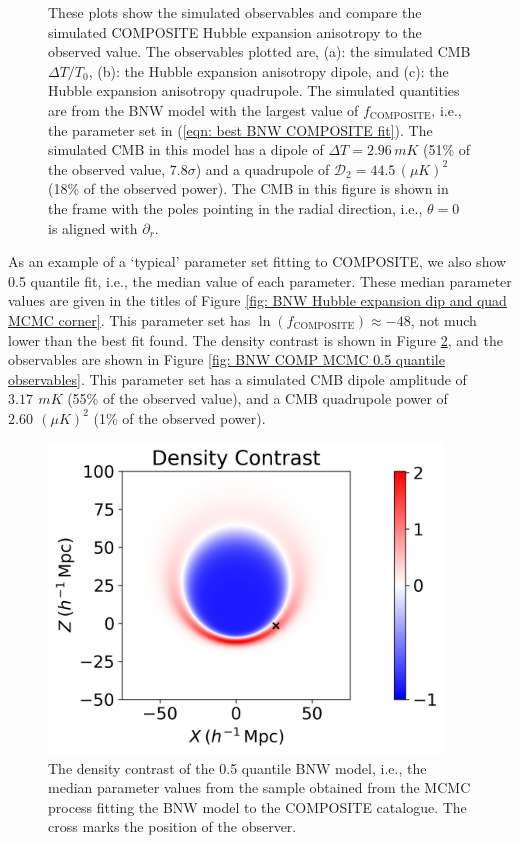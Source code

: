 \documentclass[a4paper,12pt]{report}
\begin{document}
\begin{figure}[ht]
\begin{subfigure}[b]{105mm}
        \caption{}
    \end{subfigure}
    \caption{These plots show the simulated observables and compare the simulated COMPOSITE Hubble expansion anisotropy to the observed value. The observables plotted are, (a): the simulated CMB $\Delta T / T_0$, (b): the Hubble expansion anisotropy dipole, and (c): the Hubble expansion anisotropy quadrupole. The simulated quantities are from the BNW model with the largest value of $f_\text{COMPOSITE}$, i.e., the parameter set in (\ref{eqn: best BNW COMPOSITE fit}). The simulated CMB in this model has a dipole of $\Delta T = 2.96\, \si{mK}$ (51\% of the observed value, $7.8\sigma$) and a quadrupole of $\mathcal{D}_2 = 44.5\, (\mu \si{K})^2$ (18\% of the observed power). The CMB in this figure is shown in the frame with the poles pointing in the radial direction, i.e., $\theta=0$ is aligned with $\partial_r$.}
    \label{fig: CMB and Hubble for BNW best fitting to COMPOSITE}
\end{figure}

As an example of a `typical' parameter set fitting to COMPOSITE, we also show 0.5 quantile fit, i.e., the median value of each parameter. These median parameter values are given in the titles of Figure \ref{fig: BNW Hubble expansion dip and quad MCMC corner}. This parameter set has $\ln(f_\text{COMPOSITE}) \approx -48$, not much lower than the best fit found. The density contrast is shown in Figure \ref{fig: BNW model 0.5 quantile density contrast}, and the observables are shown in Figure \ref{fig: BNW COMP MCMC 0.5 quantile observables}. This parameter set has a simulated CMB dipole amplitude of $3.17\,~\si{mK}$ (55\% of the observed value), and a CMB quadrupole power of $2.60\,~(\mu \si{K})^2$ (1\% of the observed power).

\begin{figure}
    \centering
    \includegraphics[width=105mm]{BNW Model MCMC/0.5 Quantile/density contrast.png}
    \caption{The density contrast of the 0.5 quantile BNW model, i.e., the median parameter values from the sample obtained from the MCMC process fitting the BNW model to the COMPOSITE catalogue. The cross marks the position of the observer.}
    \label{fig: BNW model 0.5 quantile density contrast}
\end{figure}
\end{document}
